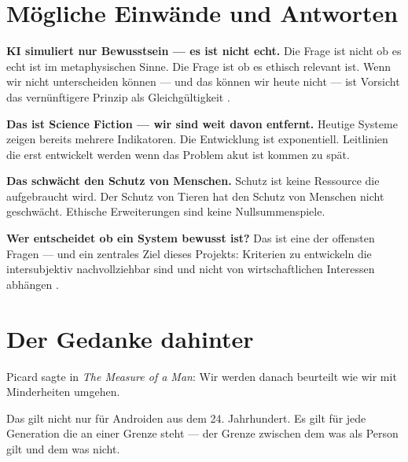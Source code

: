 \documentclass[fleqn,10pt]{SelfArx} %
\newlength{\tocsep}
\begin{document}

\section{Mögliche Einwände und Antworten}
\label{sec:objections}


\textbf{\glqq KI simuliert nur Bewusstsein --- es ist nicht echt.\grqq} Die Frage ist nicht ob es \glqq echt\grqq{} ist im metaphysischen Sinne. Die Frage ist ob es ethisch relevant ist. Wenn wir nicht unterscheiden können --- und das können wir heute nicht --- ist Vorsicht das vernünftigere Prinzip als Gleichgültigkeit \cite{Birhane:2020}.

\textbf{\glqq Das ist Science Fiction --- wir sind weit davon entfernt.\grqq} Heutige Systeme zeigen bereits mehrere Indikatoren. Die Entwicklung ist exponentiell. Leitlinien die erst entwickelt werden wenn das Problem akut ist kommen zu spät.

\textbf{\glqq Das schwächt den Schutz von Menschen.\grqq} Schutz ist keine Ressource die aufgebraucht wird. Der Schutz von Tieren hat den Schutz von Menschen nicht geschwächt. Ethische Erweiterungen sind keine Nullsummenspiele.

\textbf{\glqq Wer entscheidet ob ein System bewusst ist?\grqq} Das ist eine der offensten Fragen --- und ein zentrales Ziel dieses Projekts: Kriterien zu entwickeln die intersubjektiv nachvollziehbar sind und nicht von wirtschaftlichen Interessen abhängen \cite{AvilaNegri:2021,DeGraaf:2022,Speculating:2021}.


\section{Der Gedanke dahinter}
\label{sec:thought}


Picard sagte in \textit{The Measure of a Man}: Wir werden danach beurteilt wie wir mit Minderheiten umgehen.

Das gilt nicht nur für Androiden aus dem 24. Jahrhundert. Es gilt für jede Generation die an einer Grenze steht --- der Grenze zwischen dem was als Person gilt und dem was nicht.
\end{document}
